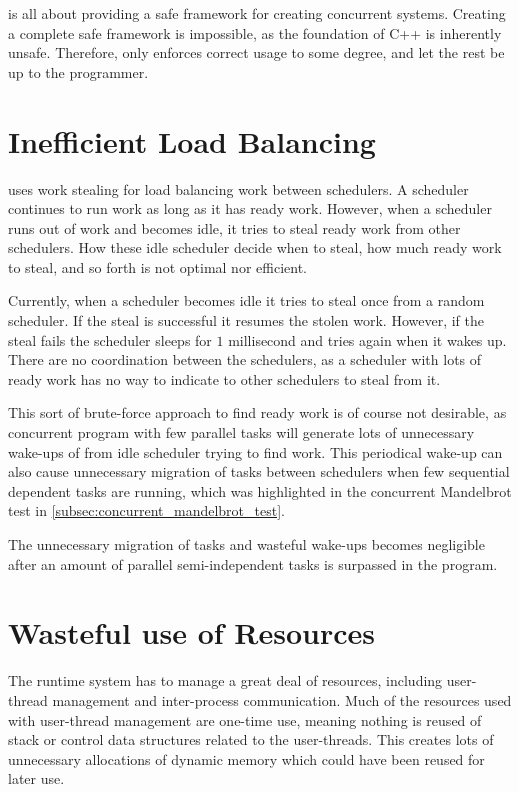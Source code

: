 \Proxc{} is all about providing a safe framework for creating concurrent systems. Creating a complete safe framework is impossible, as the foundation of C++ is inherently unsafe. Therefore, \Proxc{} only enforces correct usage to some degree, and let the rest be up to the programmer.


\section{Inefficient Load Balancing}


\Proxc{} uses work stealing for load balancing work between schedulers. A scheduler continues to run work as long as it has ready work. However, when a scheduler runs out of work and becomes idle, it tries to steal ready work from other schedulers. How these idle scheduler decide when to steal, how much ready work to steal, and so forth is not optimal nor efficient.

Currently, when a scheduler becomes idle it tries to steal once from a random scheduler. If the steal is successful it resumes the stolen work. However, if the steal fails the scheduler sleeps for $1$ millisecond and tries again when it wakes up. There are no coordination between the schedulers, as a scheduler with lots of ready work has no way to indicate to other schedulers to steal from it. 

This sort of brute\hyp{}force approach to find ready work is of course not desirable, as concurrent program with few parallel tasks will generate lots of unnecessary wake\hyp{}ups of from idle scheduler trying to find work. This periodical wake\hyp{}up can also cause unnecessary migration of tasks between schedulers when few sequential dependent tasks are running, which was highlighted in the concurrent Mandelbrot test in \cref{subsec:concurrent_mandelbrot_test}.

The unnecessary migration of tasks and wasteful wake\hyp{}ups becomes negligible after an amount of parallel semi\hyp{}independent tasks is surpassed in the program.


\section{Wasteful use of Resources}


The \Proxc{} runtime system has to manage a great deal of resources, including user\hyp{}thread management and inter\hyp{}process communication. Much of the resources used with user\hyp{}thread management are one\hyp{}time use, meaning nothing is reused of stack or control data structures related to the user\hyp{}threads. This creates lots of unnecessary allocations of dynamic memory which could have been reused for later use.

